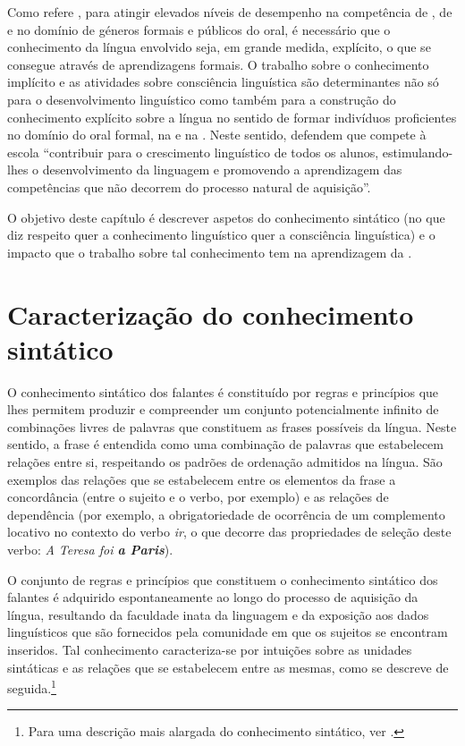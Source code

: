 \documentclass[output=paper]{LSP/langsci}
\begin{document}
Como refere \citet{duarte2008}, para atingir elevados níveis de desempenho na competência de , de  e no domínio de géneros formais e públicos do oral, é necessário que o conhecimento da língua envolvido seja, em grande medida, explícito, o que se consegue através de aprendizagens formais. O trabalho sobre o conhecimento implícito e as atividades sobre consciência linguística são determinantes não só para o desenvolvimento linguístico como também para a construção do conhecimento explícito sobre a língua no sentido de formar indivíduos proficientes no domínio do oral formal, na  e na . Neste sentido, \citet[35]{simsim_etal1997} defendem que compete à escola “contribuir para o crescimento linguístico de todos os alunos, estimulando-lhes o desenvolvimento da linguagem e promovendo a aprendizagem das competências que não decorrem do processo natural de aquisição”.

O objetivo deste capítulo é descrever aspetos do conhecimento sintático (no que diz respeito quer a conhecimento linguístico quer a consciência linguística) e o impacto que o trabalho sobre tal conhecimento tem na aprendizagem da .

\section{Caracterização do conhecimento sintático}
\label{sec:costacostagoncalves_caracterizacao}
O conhecimento sintático dos falantes é constituído por regras e princípios que lhes permitem produzir e compreender um conjunto potencialmente infinito de combinações livres de palavras que constituem as frases possíveis da língua. Neste sentido, a frase é entendida como uma combinação de palavras que estabelecem relações entre si, respeitando os padrões de ordenação admitidos na língua. São exemplos das relações que se estabelecem entre os elementos da frase a concordância (entre o sujeito e o verbo, por exemplo) e as relações de dependência (por exemplo, a obrigatoriedade de ocorrência de um complemento locativo no contexto do verbo \textit{ir}, o que decorre das propriedades de seleção deste verbo: \textit{A Teresa foi \textbf{a Paris}}).

O conjunto de regras e princípios que constituem o conhecimento sintático dos falantes é adquirido espontaneamente ao longo do processo de aquisição da língua, resultando da faculdade inata da linguagem e da exposição aos dados linguísticos que são fornecidos pela comunidade em que os sujeitos se encontram inseridos. Tal conhecimento caracteriza-se por intuições sobre as unidades sintáticas e as relações que se estabelecem entre as mesmas, como se descreve de seguida.\footnote{Para uma descrição mais alargada do conhecimento sintático, ver \citet{duartebrito1996}.}
\end{document}
